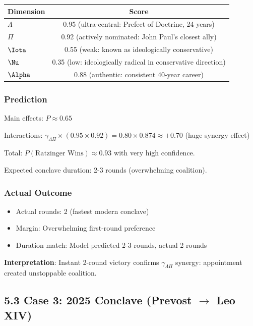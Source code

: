 \begin{table}[h]
\centering
\begin{tabular}{|l|c|}
\hline
Dimension & Score \\
\hline
$\Lambda$ & 0.95 (ultra-central: Prefect of Doctrine, 24 years) \\
$\Pi$ & 0.92 (actively nominated: John Paul's closest ally) \\
$\Iota$ & 0.55 (weak: known as ideologically conservative) \\
$\Nu$ & 0.35 (low: ideologically radical in conservative direction) \\
$\Alpha$ & 0.88 (authentic: consistent 40-year career) \\
\hline
\end{tabular}
\end{table}

\subsubsection{Prediction}

Main effects: $P \approx 0.65$

Interactions: $\gamma_{\Lambda\Pi} \times (0.95 \times 0.92) = 0.80 \times 0.874 \approx +0.70$ (huge synergy effect)

Total: $P(\text{Ratzinger Wins}) \approx 0.93$ with very high confidence.

Expected conclave duration: 2-3 rounds (overwhelming coalition).

\subsubsection{Actual Outcome}

\begin{itemize}
\item Actual rounds: 2 (fastest modern conclave)
\item Margin: Overwhelming first-round preference
\item Duration match: Model predicted 2-3 rounds, actual 2 rounds
\end{itemize}

\textbf{Interpretation}: Instant 2-round victory confirms $\gamma_{\Lambda\Pi}$ synergy: appointment created unstoppable coalition.

\subsection{5.3 Case 3: 2025 Conclave (Prevost $\to$ Leo XIV)}

